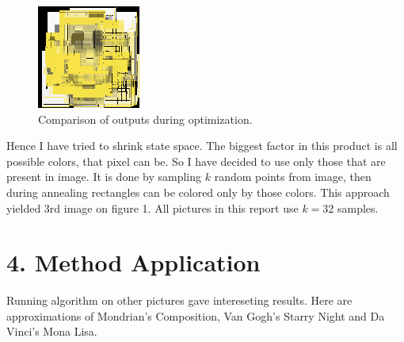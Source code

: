 \documentclass[a4paper,twocolumn]{article}
\begin{document}
\begin{figure}[h!]
\begin{minipage}[t]{0.08\textwidth}
        \end{minipage}
        \begin{minipage}[t]{0.08\textwidth}
                \centering
                \includegraphics[width=\linewidth]{approx/smiley-gg.png}
        \end{minipage}
        \caption{Comparison of outputs during optimization.}
        \label{fig:sidebyside}
\end{figure}

Hence I have tried to shrink state space. The biggest factor in this product is all possible colors, that pixel can be. So I have decided to use only those that are present in image. It is done by sampling $k$ random points from image, then during annealing rectangles can be colored only by those colors. This approach yielded 3rd image on figure 1. All pictures in this report use $k=32$ samples.

\section*{4. Method Application}

Running algorithm on other pictures gave intereseting results. Here are approximations of Mondrian's Composition, Van Gogh's Starry Night and Da Vinci's Mona Lisa.
\end{document}
